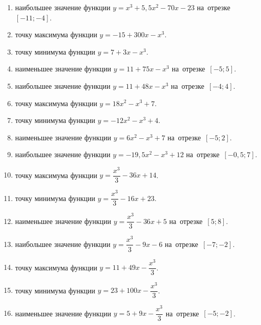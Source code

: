 \documentclass[a4paper,10pt]{article}
\begin{document}
\begin{enumerate}
\item {} наибольшее значение функции $y=x^3 +5,5x^2-70x-23$ на~отрезке~$\left[-11;-4\right]$.

\item {} точку максимума функции $y=-15+300x-x^3$.

\item {} точку минимума функции $y=7+3x-x^3$.

\item {} наименьшее значение функции $y=11+75x-x^3$ на~отрезке~$\left[-5;5\right]$.

\item {} наибольшее значение функции $y=11+48x-x^3$ на~отрезке~$\left[-4;4\right]$.

\item {} точку максимума функции $y=18x^2-x^3+7$.

\item {} точку минимума функции $y=-12x^2-x^3+4$.

\item {} наименьшее значение функции $y=6x^2-x^3+7$ на~отрезке~$\left[-5;2\right]$.

\item {} наибольшее значение функции $y=-19,5x^2-x^3+12$ на~отрезке~$\left[-0,5;7\right]$.

\item {} точку максимума функции $y=\dfrac{x^3}{3} -36x+14$.

\item {} точку минимума функции $y=\dfrac{x^3}{3} -16x+23$.

\item {} наименьшее значение функции $y=\dfrac{x^3}{3} -36x+5$ на~отрезке~$\left[5;8\right]$.

\item {} наибольшее значение функции $y=\dfrac{x^3}{3} -9x-6$ на~отрезке~$\left[-7;-2\right]$.

\item {} точку максимума функции $y=11 +49x-\dfrac{x^3}{3}$.

\item {} точку минимума функции $y=23 +100x-\dfrac{x^3}{3}$.

\item {} наименьшее значение функции $y=5 +9x-\dfrac{x^3}{3}$ на~отрезке~$\left[-5;-2\right]$.


\end{enumerate}
\end{document}
